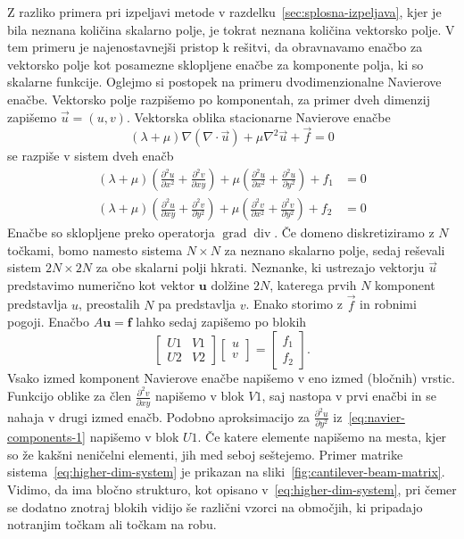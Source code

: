 \documentclass[12pt,a4paper,twoside]{article}
\theoremstyle{definition} %
\theoremstyle{plain} %
\numberwithin{equation}{section}
\renewcommand{\div}{\operatorname{div}}
\newcommand{\grad}{\operatorname{grad}}
\renewcommand{\b}{\boldsymbol}
\newcommand{\dpar}[2]{\ensuremath{\frac{\partial #1}{\partial #2}}}
\newcommand{\vu}{\vec{u}}
\newcommand{\vf}{\vec{f}}
\begin{document}
Z razliko primera pri izpeljavi metode v razdelku~\ref{sec:splosna-izpeljava}, kjer je bila neznana
količina skalarno polje, je tokrat neznana količina vektorsko polje. V tem primeru je
najenostavnejši pristop k rešitvi, da obravnavamo enačbo za vektorsko polje kot posamezne sklopljene
enačbe za komponente polja, ki so skalarne funkcije. Oglejmo si postopek na primeru dvodimenzionalne
Navierove enačbe. Vektorsko polje razpišemo po komponentah, za primer dveh dimenzij zapišemo $\vu =
(u, v)$. Vektorska oblika stacionarne Navierove enačbe
\begin{equation}
  (\lambda+\mu)\nabla(\nabla\cdot \vu) + \mu\nabla^2 \vu + \vf = 0
\end{equation}
se razpiše v sistem dveh enačb
\begin{align}
  \label{eq:navier-components-1}
(\lambda +\mu ) \left(\dpar{^2u}{x^2}+\dpar{^2v}{xy}\right)+\mu  \left(\dpar{^2u}{x^2}+\dpar{^2u}{y^2}\right)+f_1&=0 \\
(\lambda +\mu ) \left(\dpar{^2u}{xy}+\dpar{^2v}{y^2}\right)+\mu  \left(\dpar{^2v}{x^2}+\dpar{^2v}{y^2}\right)+f_2&=0
\end{align}
Enačbe so sklopljene preko operatorja $\grad\div$. Če domeno diskretiziramo z $N$ točkami, bomo
namesto sistema $N\times N$ za neznano skalarno polje, sedaj reševali sistem $2N\times 2N$ za
obe skalarni polji hkrati. Neznanke, ki ustrezajo vektorju $\vu$ predstavimo numerično kot vektor
$\b{u}$ dolžine $2N$, katerega prvih $N$ komponent predstavlja $u$, preostalih $N$ pa predstavlja $v$.
Enako storimo z $\vf$ in robnimi pogoji. Enačbo $A\b u = \b f$ lahko sedaj zapišemo po blokih
\begin{equation}
  \begin{bmatrix}
    U1 & V1 \\
    U2 & V2
  \end{bmatrix}
  \begin{bmatrix}
    u \\ v
  \end{bmatrix}
  =
  \begin{bmatrix}
    f_1 \\ f_2
  \end{bmatrix}.
  \label{eq:higher-dim-system}
\end{equation}
Vsako izmed komponent Navierove enačbe napišemo v eno izmed (bločnih) vrstic. Funkcijo
oblike za člen $\dpar{^2v}{xy}$ napišemo v blok $V1$, saj nastopa v prvi enačbi in se nahaja v drugi
izmed enačb. Podobno aproksimacijo za $\dpar{^2u}{y^2}$ iz~\eqref{eq:navier-components-1} napišemo
v blok $U1$. Če katere elemente napišemo na mesta, kjer so že kakšni neničelni elementi, jih med
seboj seštejemo. Primer matrike sistema~\eqref{eq:higher-dim-system} je prikazan na
sliki~\ref{fig:cantilever-beam-matrix}. Vidimo, da ima bločno strukturo, kot opisano
v~\eqref{eq:higher-dim-system}, pri čemer se dodatno znotraj blokih vidijo še različni vzorci na
območjih, ki pripadajo notranjim točkam ali točkam na robu.
\end{document}
